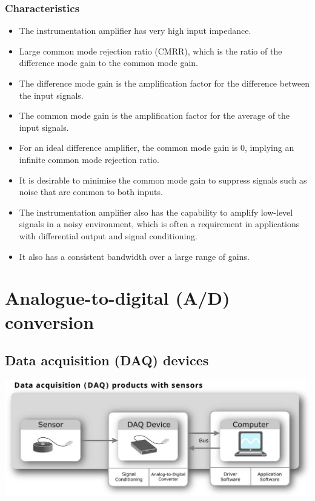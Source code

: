 \documentclass[11pt]{article}
\begin{document}
\subsubsection{Characteristics}
\label{sec:orgabc0dc7}
\begin{itemize}
\item The instrumentation amplifier has very high input impedance.
\item Large common mode rejection ratio (CMRR), which is the ratio of the difference mode gain to the common mode gain.
\item The difference mode gain is the amplification factor for the difference between the input signals.
\item The common mode gain is the amplification factor for the average of the input signals.
\item For an ideal difference amplifier, the common mode gain is 0, implying an infinite common mode rejection ratio.
\item It is desirable to minimise the common mode gain to suppress signals such as noise that are common to both inputs.
\item The instrumentation amplifier also has the capability to amplify low-level signals in a noisy environment, which is often a requirement in applications with differential output and signal conditioning.
\item It also has a consistent bandwidth over a large range of gains.
\end{itemize}
\section{Analogue-to-digital (A/D) conversion}
\label{sec:org6dd1a4e}

\subsection{Data acquisition (DAQ) devices}
\label{sec:org9df6bd5}
\begin{center}
\includegraphics[width=.9\linewidth]{./images/data-acquisition-flow-chart.png}
\end{center}
\end{document}
